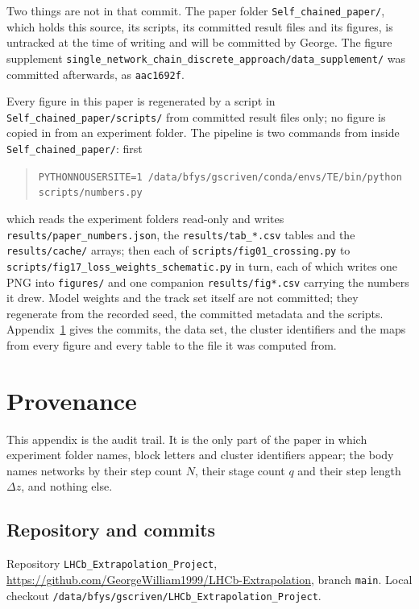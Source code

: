 \documentclass[11pt,a4paper]{article}
\begin{document}
Two things are not in that commit. The paper folder
\texttt{Self\_chained\_paper/}, which holds this source, its scripts, its
committed result files and its figures, is untracked at the time of writing and
will be committed by George. The figure supplement
\texttt{single\_network\_chain\_discrete\_approach/data\_supplement/} was
committed afterwards, as \texttt{aac1692f}.

Every figure in this paper is regenerated by a script in
\texttt{Self\_chained\_paper/scripts/} from committed result files only; no
figure is copied in from an experiment folder. The pipeline is two commands
from inside \texttt{Self\_chained\_paper/}: first
%
\begin{quote}
\texttt{PYTHONNOUSERSITE=1 /data/bfys/gscriven/conda/envs/TE/bin/python scripts/numbers.py}
\end{quote}
%
which reads the experiment folders read-only and writes
\texttt{results/paper\_numbers.json}, the \texttt{results/tab\_*.csv} tables and
the \texttt{results/cache/} arrays; then each of
\texttt{scripts/fig01\_crossing.py} to
\texttt{scripts/fig17\_loss\_weights\_schematic.py} in turn,
each of which writes one PNG into \texttt{figures/} and one companion
\texttt{results/fig*.csv} carrying the numbers it drew. Model weights and the
track set itself are not committed; they regenerate from the recorded seed, the
committed metadata and the scripts. Appendix~\ref{sec:provenance} gives the
commits, the data set, the cluster identifiers and the maps from every figure
and every table to the file it was computed from.

\appendix
\section{Provenance}
\label{sec:provenance}

This appendix is the audit trail. It is the only part of the paper in which
experiment folder names, block letters and cluster identifiers appear; the body
names networks by their step count $N$, their stage count $q$ and their step
length $\Delta z$, and nothing else.

\subsection*{Repository and commits}

Repository \texttt{LHCb\_Extrapolation\_Project},
\url{https://github.com/GeorgeWilliam1999/LHCb-Extrapolation}, branch
\texttt{main}. Local checkout
\texttt{/data/bfys/gscriven/LHCb\_Extrapolation\_Project}.
\end{document}
